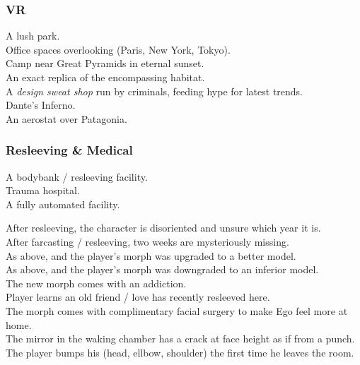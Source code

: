 \documentclass[a4]{article}
\begin{document}
\subsubsection{VR}


\starttableone
A lush park.\\
Office spaces overlooking (Paris, New York, Tokyo).\\
Camp near Great Pyramids in eternal sunset.\\
An exact replica of the encompassing habitat.\\
A \textit{design sweat shop} run by criminals, feeding hype for latest trends.\\
Dante's Inferno.\\
An aerostat over Patagonia.\\
\stoptableone


\starttableone
\stoptableone





\subsubsection{Resleeving \& Medical}

\starttableone
A bodybank / resleeving facility.\\
Trauma hospital.\\
A fully automated  facility.\\
\stoptableone


\starttableone
After resleeving, the character is disoriented and unsure which year it is.\\
After farcasting / resleeving, two weeks are mysteriously missing.\\
As above, and the player's morph was upgraded to a better model.\\
As above, and the player's morph was downgraded to an inferior model.\\
The new morph comes with an addiction.\\
Player learns an old friend / love has recently resleeved here.\\
The morph comes with complimentary facial surgery to make Ego feel more at home.\\
The mirror in the waking chamber has a crack at face height as if from a punch.\\
The player bumps his (head, ellbow, shoulder) the first time he leaves the room.\\
\stoptableone
\end{document}
